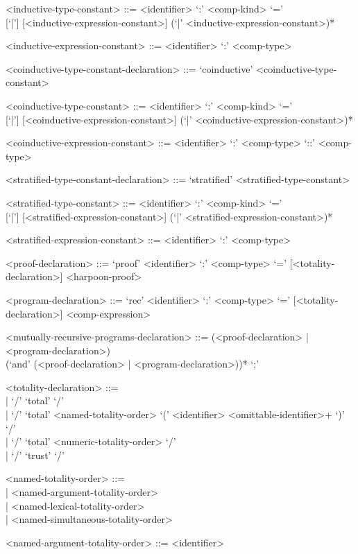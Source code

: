\documentclass[11pt]{article}
\begin{document}
\begin{grammar}
<inductive-type-constant> ::= <identifier> `:' <comp-kind> `='\\{}
 [`|'] [<inductive-expression-constant>] (`|' <inductive-expression-constant>)*

<inductive-expression-constant> ::= <identifier> `:' <comp-type>

<coinductive-type-constant-declaration> ::= `coinductive' <coinductive-type-constant>

<coinductive-type-constant> ::= <identifier> `:' <comp-kind> `='\\{}
 [`|'] [<coinductive-expression-constant>] (`|' <coinductive-expression-constant>)*

<coinductive-expression-constant> ::= <identifier> `:' <comp-type> `::' <comp-type>

<stratified-type-constant-declaration> ::= `stratified' <stratified-type-constant>

<stratified-type-constant> ::= <identifier> `:' <comp-kind> `='\\{}
 [`|'] [<stratified-expression-constant>] (`|' <stratified-expression-constant>)*

<stratified-expression-constant> ::= <identifier> `:' <comp-type>

<proof-declaration> ::= `proof' <identifier> `:' <comp-type> `=' [<totality-declaration>] <harpoon-proof>

<program-declaration> ::= `rec' <identifier> `:' <comp-type> `=' [<totality-declaration>] <comp-expression>

<mutually-recursive-programs-declaration> ::= (<proof-declaration> | <program-declaration>) \\
(`and' (<proof-declaration> | <program-declaration>))* `;'

<totality-declaration> ::= \hfill\\
| `/' `total' `/'\\
| `/' `total' <named-totality-order> `(' <identifier> <omittable-identifier>+ `)' `/'\\
| `/' `total' <numeric-totality-order> `/'\\
| `/' `trust' `/'

<named-totality-order> ::= \hfill\\
| <named-argument-totality-order>\\
| <named-lexical-totality-order>\\
| <named-simultaneous-totality-order>

<named-argument-totality-order> ::= <identifier>


\end{grammar}
\end{document}
